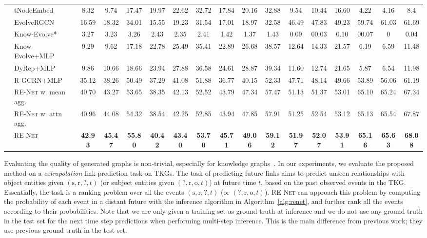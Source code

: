 \documentclass[11pt,a4paper]{article}
\newcommand{\method}{\textsc{RE-Net}\xspace}
\newcommand{\bs}{\mathrm{s}}
\newcommand{\br}{\mathrm{r}}
\newcommand{\bo}{\mathrm{o}}
\begin{document}
\begin{table}[tb!]
{\begin{tabular}{ll|ccc|ccc|ccc|ccc|ccc}
&tNodeEmbed&8.32   &9.74   &17.47  &19.97  &22.62  &32.72  &17.84  &20.16  &32.88  &9.54   &10.44  &16.60  &4.22   &4.16   &8.4    \\
&EvolveRGCN&16.59  &18.32  &34.01  &15.55  &19.23  &31.54  &17.01  &18.97  &32.58  &46.49  &47.83  &49.23    &59.74  &61.03  &61.69    \\
&Know-Evolve* &3.27   &3.23   &3.26   &2.43   &2.35   &2.41   &1.42   &1.37   &1.43   &0.09   &00.03  &0.10   &00.07  &0      &0.04   \\ 
&Know-Evolve+MLP        &9.29   &9.62   &17.18  &22.78  &25.49  &35.41  &22.89  &26.68  &38.57  &12.64  &14.33  &21.57  &6.19   &6.59   &11.48  \\ 
&DyRep+MLP &9.86   &10.66  &18.66  &23.94  &27.88  &36.58  &24.61  &28.87  &39.34  &11.60  &12.74  &21.65  &5.87   &6.54   &11.98  \\ 
&R-GCRN+MLP&35.12  &38.26  &50.49  &37.29  &41.08  &51.88  &36.77  &40.15  &52.33  &47.71  &48.14  &49.66  &53.89  &56.06  &61.19  \\ 
\cmidrule{2-17}
&\method w. mean agg.   &40.70  &43.27   &53.65 &38.35  &42.13  &52.52  &43.79  &47.34  &57.47  &51.13  &51.37  &53.01  &65.10  &65.24  &67.34  \\
&\method w. attn agg.   &40.96  &44.08   &54.32 &38.54  &42.25  &52.85  &43.94  &47.85  &57.91	&51.25  &52.54  &53.12  &65.13  &65.54  &67.87  \\
&\method                &\textbf{42.93} &\textbf{45.47} &\textbf{55.80} &\textbf{40.42} &\textbf{43.40} &\textbf{53.70} &\textbf{45.71} &\textbf{49.06} &	\textbf{59.12}  &\textbf{51.97} &\textbf{52.07} &\textbf{53.91} &\textbf{65.16} &\textbf{65.63} &\textbf{68.08}\\
\cmidrule[1pt](){2-17}
\end{tabular}}
\end{table}


Evaluating the quality of generated graphs is non-trivial, especially for knowledge graphs~\citep{theis2015note}.
In our experiments, we evaluate the proposed method on a \textit{extrapolation} link prediction task on TKGs. 
The task of predicting future links aims to predict unseen relationships with object entities given $(\bs,\br,?,t)$ (or subject entities given $(?,\br,\bo,t)$) at future time $t$, based on the past observed events in the TKG. Essentially, the task is a ranking problem over all the events $(\bs,\br,?,t)$ (or $(?,\br,\bo,t)$). \method can approach this problem by computing the probability of each event in a distant future with the inference algorithm in Algorithm~\ref{alg:renet}, and further rank all the events according to their probabilities.
Note that we are only given a training set as ground truth at inference and we do not use any ground truth in the test set for the next time step predictions when performing multi-step inference.
This is the main difference from previous work; they use previous ground truth in the test set.
\end{document}

